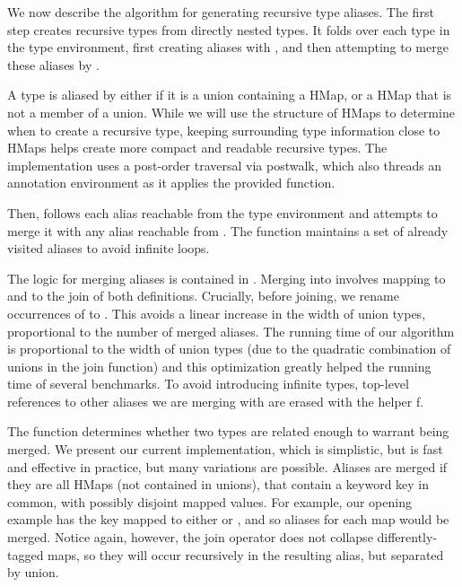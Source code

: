 We now describe the algorithm for generating recursive type aliases.
The first step \squashlocal{} creates recursive types from directly nested types.
It folds over each type in the type environment, first
creating aliases with \aliashmap{}, and then
attempting to merge these aliases by \squashall{}.

A type is aliased by \aliashmap{} either if it is a union containing a HMap,
or a HMap that is not a member of a union.
While we will use the structure of HMaps to determine when to create a recursive
type, keeping surrounding type information close to HMaps helps create more
compact and readable recursive types.
The implementation uses a post-order traversal via \textsf{postwalk},
which also threads an annotation environment as it applies
the provided function.

Then, \squashall{} follows each alias  reachable from the type environment
and attempts to merge it with any alias reachable from .
The \squash{} function maintains 
a set of already visited aliases to avoid infinite loops.

The logic for merging aliases is contained in \mergealiases{}.
Merging  into  involves mapping 
to  and  to the join of both definitions.
Crucially, before joining, we rename occurrences of 
 to . This avoids a linear increase in the
width of union types, proportional to the number of merged aliases.
The running time of our algorithm is proportional to the
width of union types (due to the quadratic combination of
unions in the join function) and this optimization greatly
helped the running time of several benchmarks.
To avoid introducing infinite types,
top-level references to other aliases we are merging with
are erased with the helper \textsf{f}.

The \shouldmergeOp{} function determines whether two types are related enough
to warrant being merged. We present our current implementation, which is simplistic,
but is fast and effective in practice, but many variations are possible.
Aliases are merged if they are all HMaps (not contained in unions), that
contain a keyword key in common, with possibly disjoint mapped values.
For example, our opening example has the  key mapped to either
 or , and so aliases for each map would be merged.
Notice again, however, the join operator does not collapse differently-tagged
maps, so they will occur recursively in the resulting alias, but separated by union.

